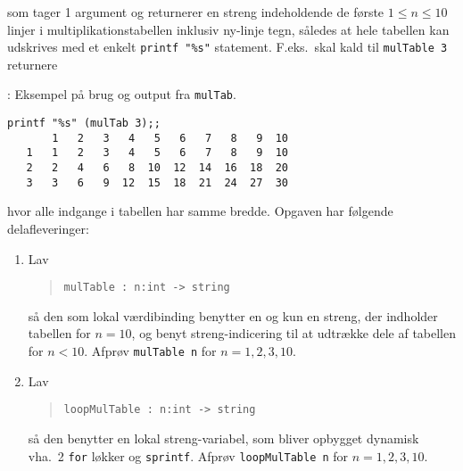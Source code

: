 \documentclass[a4paper,12pt]{article}
\begin{document}
\begin{enumerate}[label=3i.\arabic*,start=0]
\begin{quote}
  \end{quote}
  som tager 1 argument og returnerer en streng indeholdende de første $1\leq n\leq 10$ linjer i multiplikationstabellen inklusiv ny-linje tegn, således at hele tabellen kan udskrives med et enkelt \lstinline!printf "%s"! statement. F.eks.\ skal kald til \mbox{\lstinline!mulTable 3!} returnere
  \begin{codeNOutput}[label=mulTab]{: Eksempel på brug og output fra \lstinline!mulTab!.}
\begin{lstlisting}
printf "%s" (mulTab 3);;
       1   2   3   4   5   6   7   8   9  10
   1   1   2   3   4   5   6   7   8   9  10
   2   2   4   6   8  10  12  14  16  18  20
   3   3   6   9  12  15  18  21  24  27  30
\end{lstlisting}
\end{codeNOutput}
hvor alle indgange i tabellen har samme bredde. Opgaven har følgende del\-afleveringer:
  \begin{enumerate}
  \item Lav
    \begin{quote}
      \mbox{\lstinline!mulTable : n:int -> string!}
    \end{quote}
så den som lokal værdibinding benytter en og kun en streng, der indholder tabellen for $n=10$, og benyt streng-indicering til at udtrække dele af tabellen for $n<10$.  Afprøv \mbox{\lstinline!mulTable n!} for $n= 1, 2, 3, 10$.
  \item Lav
    \begin{quote}
      \mbox{\lstinline!loopMulTable : n:int -> string!}
    \end{quote}
så den benytter en lokal streng-variabel, som bliver opbygget dynamisk vha.\ 2 \lstinline!for! løkker og \lstinline!sprintf!.  Afprøv \mbox{\lstinline!loopMulTable n!} for $n= 1, 2, 3, 10$.

\end{enumerate}
\end{enumerate}
\end{document}
